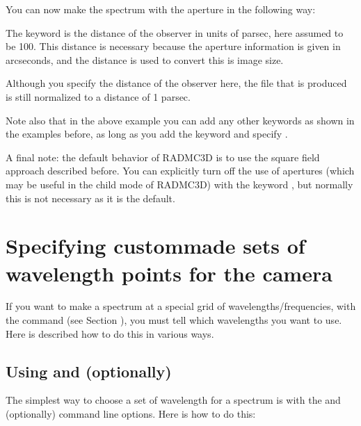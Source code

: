 \documentclass[letterpaper,10pt,english]{sphinxmanual}
\begin{document}
You can now make the spectrum with the aperture in the following way:

\begin{sphinxVerbatim}[commandchars=\\\{\}]
    
\end{sphinxVerbatim}

The keyword  is the distance of the observer in units of
parsec, here assumed to be 100. This distance is necessary
because the aperture information is given in arcseconds, and the distance is
used to convert this is image size.

 Although you specify the distance of the observer
here, the  file that is produced is still normalized
to a distance of 1 parsec.

Note also that in the above example you can add any other keywords as shown
in the examples before, as long as you add the  keyword
and specify .

A final note: the default behavior of RADMC\sphinxhyphen{}3D is to use the square field
approach described before. You can explicitly turn off the use of apertures
(which may be useful in the child mode of RADMC\sphinxhyphen{}3D) with the keyword
, but normally this is not necessary as it is the default.


\section{Specifying custom\sphinxhyphen{}made sets of wavelength points for the camera}
\label{\detokenize{imagesspectra:specifying-custom-made-sets-of-wavelength-points-for-the-camera}}\label{\detokenize{imagesspectra:sec-set-camera-frequencies}}
If you want to make a spectrum at a special grid of wavelengths/frequencies,
with the  command (see Section {\hyperref[\detokenize{imagesspectra:sec-making-spectra}]{}}), you must
tell  which wavelengths you want to use. Here is described how to do
this in various ways.


\subsection{Using  and (optionally) }
\label{\detokenize{imagesspectra:using-lambdarange-and-optionally-nlam}}
The simplest way to choose a set of wavelength for a spectrum is with the
 and (optionally)  command line options. Here is how to
do this:
\end{document}
